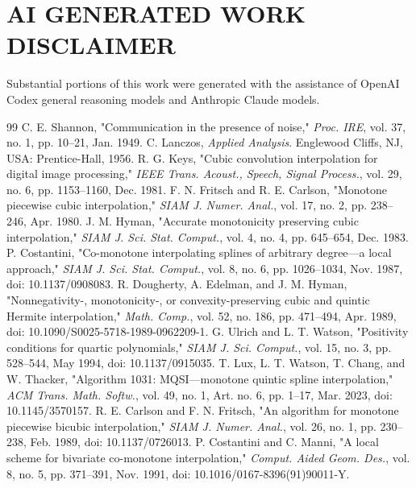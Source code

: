 \documentclass[journal]{IEEEtran}
\begin{document}
\section*{AI GENERATED WORK DISCLAIMER}

Substantial portions of this work were generated with the assistance of
OpenAI Codex general reasoning models and Anthropic Claude models.

\begin{thebibliography}{99}
\scriptsize
{}
C. E. Shannon, "Communication in the presence of noise," \emph{Proc. IRE},
vol. 37, no. 1, pp. 10--21, Jan. 1949.
C. Lanczos, \emph{Applied Analysis}. Englewood Cliffs, NJ, USA:
Prentice-Hall, 1956.
R. G. Keys, "Cubic convolution interpolation for digital image
processing," \emph{IEEE Trans. Acoust., Speech, Signal Process.}, vol. 29,
no. 6, pp. 1153--1160, Dec. 1981.
F. N. Fritsch and R. E. Carlson, "Monotone piecewise cubic interpolation,"
\emph{SIAM J. Numer. Anal.}, vol. 17, no. 2, pp. 238--246, Apr. 1980.
J. M. Hyman, "Accurate monotonicity preserving cubic interpolation,"
\emph{SIAM J. Sci. Stat. Comput.}, vol. 4, no. 4, pp. 645--654, Dec. 1983.
P. Costantini, "Co-monotone interpolating splines of arbitrary degree---a
local approach," \emph{SIAM J. Sci. Stat. Comput.}, vol. 8, no. 6,
pp. 1026--1034, Nov. 1987, doi: 10.1137/0908083.
R. Dougherty, A. Edelman, and J. M. Hyman, "Nonnegativity-,
monotonicity-, or convexity-preserving cubic and quintic Hermite
interpolation," \emph{Math. Comp.}, vol. 52, no. 186, pp. 471--494,
Apr. 1989, doi: 10.1090/S0025-5718-1989-0962209-1.
G. Ulrich and L. T. Watson, "Positivity conditions for quartic
polynomials," \emph{SIAM J. Sci. Comput.}, vol. 15, no. 3, pp. 528--544,
May 1994, doi: 10.1137/0915035.
T. Lux, L. T. Watson, T. Chang, and W. Thacker, "Algorithm 1031:
MQSI---monotone quintic spline interpolation," \emph{ACM Trans. Math.
Softw.}, vol. 49, no. 1, Art. no. 6, pp. 1--17, Mar. 2023,
doi: 10.1145/3570157.
R. E. Carlson and F. N. Fritsch, "An algorithm for monotone piecewise
bicubic interpolation," \emph{SIAM J. Numer. Anal.}, vol. 26, no. 1,
pp. 230--238, Feb. 1989, doi: 10.1137/0726013.
P. Costantini and C. Manni, "A local scheme for bivariate co-monotone
interpolation," \emph{Comput. Aided Geom. Des.}, vol. 8, no. 5,
pp. 371--391, Nov. 1991, doi: 10.1016/0167-8396(91)90011-Y.

\end{thebibliography}
\end{document}
